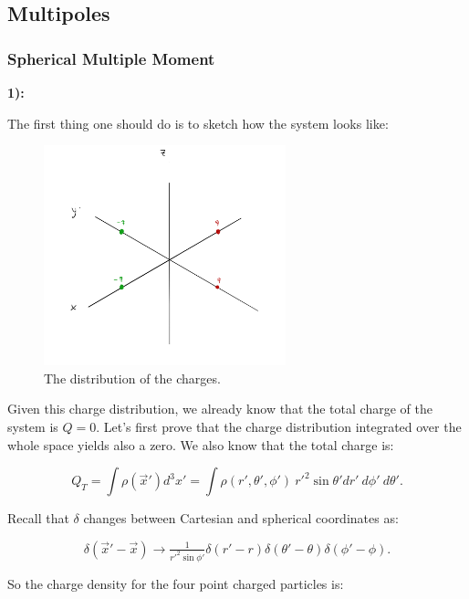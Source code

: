 \subsection{Multipoles}

\subsubsection{Spherical Multiple Moment}\label{Spherical Multiple Moment}

\textbf{1):}

The first thing one should do is to sketch how the system looks like:

\begin{figure}[h]
	\includegraphics[width=7cm]{figures/Quadrupole.png}
	\centering
	\caption{The distribution of the charges.}
\end{figure}

Given this charge distribution, we already know that the total charge of the system is $Q=0$. Let's first prove that the charge distribution integrated over the whole space yields also a zero. We also know that the total charge is:
	
\begin{equation}
	Q_{T} = \int \rho (\vec{x}') d^{3}x' = \int \rho(r', \theta', \phi')\: r'^{2} \sin\theta' dr' \: d\phi' \: d\theta'.
\end{equation}

Recall that $\delta$ changes between Cartesian and spherical coordinates as:

\begin{equation}
	\delta (\vec{x}' - \vec{x}) \rightarrow \tfrac{1}{r'^{2} \sin \phi'} \delta (r' -r) \delta(\theta' -\theta) \delta (\phi' - \phi).
\end{equation}

So the charge density for the four point charged particles is:

